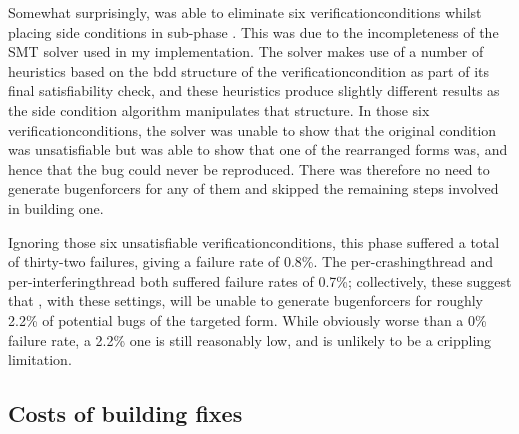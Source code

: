 Somewhat surprisingly, {\technique} was able to eliminate six
\glspl{verificationcondition} whilst placing \glspl{side condition} in
sub-phase .  This was due to the incompleteness of the SMT
solver used in my implementation.  The solver makes use of a number of
heuristics based on the \gls{bdd} structure of the
\gls{verificationcondition} as part of its final satisfiability check,
and these heuristics produce slightly different results as the
\gls{side condition} algorithm manipulates that structure.  In those
six \glspl{verificationcondition}, the solver was unable to show that
the original condition was unsatisfiable but was able to show that one
of the rearranged forms was, and hence that the bug could never be
reproduced.  There was therefore no need to generate
\glspl{bugenforcer} for any of them and {\technique} skipped the
remaining steps involved in building one.

Ignoring those six unsatisfiable \glspl{verificationcondition}, this
phase suffered a total of thirty-two failures, giving a failure rate
of 0.8\%.  The per-\gls{crashingthread} and
per-\gls{interferingthread} both suffered failure rates of 0.7\%;
collectively, these suggest that {\technique}, with these settings,
will be unable to generate \glspl{bugenforcer} for roughly 2.2\% of
potential bugs of the targeted form.  While obviously worse than a 0\%
failure rate, a 2.2\% one is still reasonably low, and is unlikely to
be a crippling limitation.

\subsection{Costs of building fixes}

